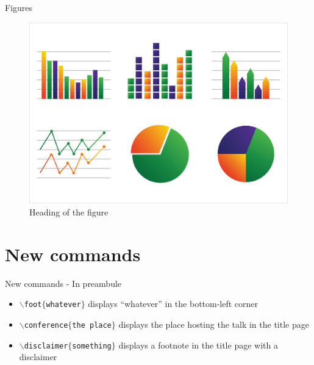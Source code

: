 \documentclass[numbertotal,toc,wide]{../bpslides}
\begin{document}
\begin{frame}{Figures}
	\begin{figure}
		\centering
		\caption{Heading of the figure}
		\includegraphics[width=0.9\paperheight]{graph}
	\end{figure}
\end{frame}

\section{New commands}

\begin{frame}{New commands - In preambule}
	\begin{itemize}
		\item \texttt{$\backslash$foot$\{$whatever$\}$} displays ``whatever'' in the bottom-left corner
		\item \texttt{$\backslash$conference$\{$the place$\}$} displays the place hosting the talk in the title page
		\item \texttt{$\backslash$disclaimer$\{$something$\}$} displays a footnote in the title page with a disclaimer
	\end{itemize}
\end{frame}
\end{document}
